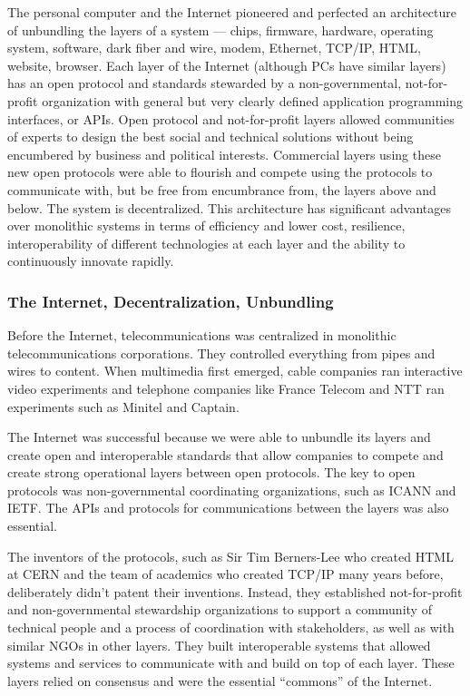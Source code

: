 The personal computer and the Internet pioneered and perfected an architecture of unbundling the layers of a system --- chips, firmware, hardware, operating system, software, dark fiber and wire, modem, Ethernet, \ac{TCP/IP}, \ac{HTML}, website, browser. Each layer of the Internet (although PCs have similar layers) has an open protocol and standards stewarded by a non-governmental, not-for-profit organization with general but very clearly defined application programming interfaces, or \ac{API}s. Open protocol and not-for-profit layers allowed communities of experts to design the best social and technical solutions without being encumbered by business and political interests. Commercial layers using these new open protocols were able to flourish and compete using the protocols to communicate with, but be free from encumbrance from, the layers above and below. The system is decentralized. This architecture has significant advantages over monolithic systems in terms of efficiency and lower cost, resilience, interoperability of different technologies at each layer and the ability to continuously innovate rapidly.

\subsubsection{The Internet, Decentralization, Unbundling}

Before the Internet, telecommunications was centralized in monolithic telecommunications corporations. They controlled everything from pipes and wires to content. When multimedia first emerged, cable companies ran interactive video experiments and telephone companies like France Telecom and \ac{NTT} ran experiments such as Minitel and Captain.

The Internet was successful because we were able to unbundle its layers and create open and interoperable standards that allow companies to compete and create strong operational layers between open protocols. The key to open protocols was non-governmental coordinating organizations, such as \ac{ICANN} and \ac{IETF}. The \ac{API}s and protocols for communications between the layers was also essential.

The inventors of the protocols, such as Sir Tim Berners-Lee who created \ac{HTML} at \ac{CERN} and the team of academics who created \ac{TCP/IP} many years before, deliberately didn't patent their inventions. Instead, they established not-for-profit and non-governmental stewardship organizations to support a community of technical people and a process of coordination with stakeholders, as well as with similar \ac{NGO}s in other layers. They built interoperable systems that allowed systems and services to communicate with and build on top of each layer. These layers relied on consensus and were the essential ``commons'' of the Internet.

